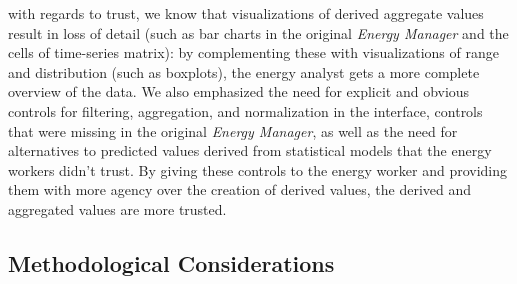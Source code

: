\documentclass[journal]{vgtc}                %
\newcommand{\bstart}[1]{\vspace{1mm} \noindent{\textbf{#1:}}}
\begin{document}
\bstart{Trust} with regards to trust, we know that visualizations of derived aggregate values result in loss of detail (such as bar charts in the original {\it Energy Manager} and the cells of time-series matrix): by complementing these with visualizations of range and distribution (such as boxplots), the energy analyst gets a more complete overview of the data.
We also emphasized the need for explicit and obvious controls for filtering, aggregation, and normalization in the interface, controls that were missing in the original {\it Energy Manager}, as well as the need for alternatives to predicted values derived from statistical models that the energy workers didn't trust. 
By giving these controls to the energy worker and providing them with more agency over the creation of derived values, the derived and aggregated values are more trusted. 


\subsection{Methodological Considerations}
\label{discussion-methodology}

\end{document}
